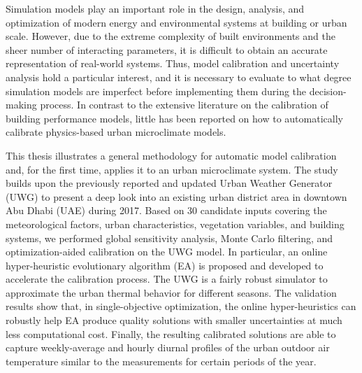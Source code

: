 % 
% 
%
Simulation models play an important role in the design, analysis, and optimization of modern energy and environmental systems at building or urban scale. However, due to the extreme complexity of built environments and the sheer number of interacting parameters, it is difficult to obtain an accurate representation of real-world systems. Thus, model calibration and uncertainty analysis hold a particular interest, and it is necessary to evaluate to what degree simulation models are imperfect before implementing them during the decision-making process. In contrast to the extensive literature on the calibration of building performance models, little has been reported on how to automatically calibrate physics-based urban microclimate models. 

This thesis illustrates a general methodology for automatic model calibration and, for the first time, applies it to an urban microclimate system. The study builds upon the previously reported and updated Urban Weather Generator (UWG) to present a deep look into an existing urban district area in downtown Abu Dhabi (UAE) during 2017. Based on 30 candidate inputs covering the meteorological factors, urban characteristics, vegetation variables, and building systems, we performed global sensitivity analysis, Monte Carlo filtering, and optimization-aided calibration on the UWG model. In particular, an online hyper-heuristic evolutionary algorithm (EA) is proposed and developed to accelerate the calibration process. The UWG is a fairly robust simulator to approximate the urban thermal behavior for different seasons. The validation results show that, in single-objective optimization, the online hyper-heuristics can robustly help EA produce quality solutions with smaller uncertainties at much less computational cost. Finally, the resulting calibrated solutions are able to capture weekly-average and hourly diurnal profiles of the urban outdoor air temperature similar to the measurements for certain periods of the year.

